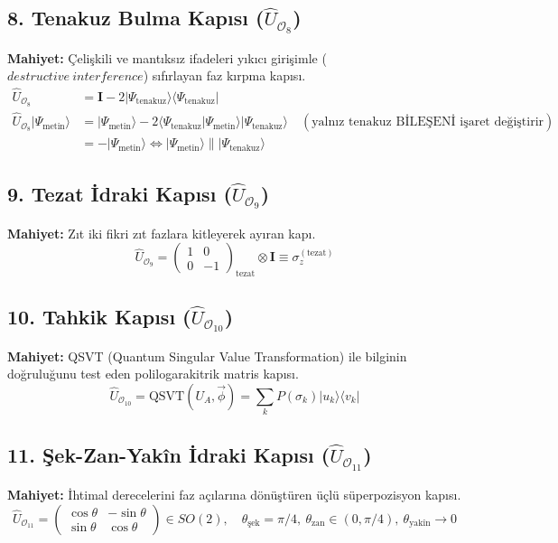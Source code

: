 \documentclass[11pt, a4paper]{article}
\begin{document}
\subsection{8. Tenakuz Bulma Kapısı ($\hat{U}_{\mathcal{O}_8}$)}
\textbf{Mahiyet:} Çelişkili ve mantıksız ifadeleri yıkıcı girişimle ($destructive\ interference$) sıfırlayan faz kırpma kapısı.
\begin{align}
\hat{U}_{\mathcal{O}_8} &= \mathbf{I} - 2 |\Psi_{\text{tenakuz}}\rangle \langle \Psi_{\text{tenakuz}}| \\
\hat{U}_{\mathcal{O}_8} |\Psi_{\text{metin}}\rangle &= |\Psi_{\text{metin}}\rangle - 2 \langle \Psi_{\text{tenakuz}} | \Psi_{\text{metin}} \rangle |\Psi_{\text{tenakuz}}\rangle \quad (\text{yalnız tenakuz BİLEŞENİ işaret değiştirir}) \\ &= -|\Psi_{\text{metin}}\rangle \iff |\Psi_{\text{metin}}\rangle \parallel |\Psi_{\text{tenakuz}}\rangle
\end{align}

\subsection{9. Tezat İdraki Kapısı ($\hat{U}_{\mathcal{O}_9}$)}
\textbf{Mahiyet:} Zıt iki fikri zıt fazlara kitleyerek ayıran kapı.
\begin{equation}
\hat{U}_{\mathcal{O}_9} = \begin{pmatrix} 1 & 0 \\ 0 & -1 \end{pmatrix}_{\text{tezat}} \otimes \mathbf{I} \equiv \sigma_z^{(\text{tezat})}
\end{equation}

\subsection{10. Tahkik Kapısı ($\hat{U}_{\mathcal{O}_{10}}$)}
\textbf{Mahiyet:} QSVT (Quantum Singular Value Transformation) ile bilginin doğruluğunu test eden polilogarakitrik matris kapısı.
\begin{equation}
\hat{U}_{\mathcal{O}_{10}} = \text{QSVT}(U_A, \vec{\phi}) = \sum_k P(\sigma_k) |u_k\rangle \langle v_k|
\end{equation}

\subsection{11. Şek-Zan-Yakîn İdraki Kapısı ($\hat{U}_{\mathcal{O}_{11}}$)}
\textbf{Mahiyet:} İhtimal derecelerini faz açılarına dönüştüren üçlü süperpozisyon kapısı.
\begin{equation}
\hat{U}_{\mathcal{O}_{11}} = \begin{pmatrix} \cos\theta & -\sin\theta \\ \sin\theta & \cos\theta \end{pmatrix} \in SO(2), \quad \theta_{\text{şek}} = \pi/4,\ \theta_{\text{zan}} \in (0,\pi/4),\ \theta_{\text{yakîn}} \to 0
\end{equation}
\end{document}
